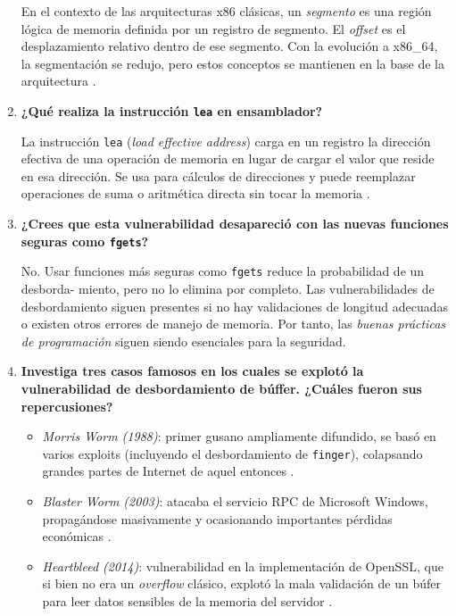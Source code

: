 \begin{enumerate}
    En el contexto de las arquitecturas x86 clásicas, un \textit{segmento} es una región 
    lógica de memoria definida por un registro de segmento. El \textit{offset} es el 
    desplazamiento relativo dentro de ese segmento. Con la evolución a x86\_64, la segmentación 
    se redujo, pero estos conceptos se mantienen en la base de la arquitectura \citep{erickson2008}.

    \item \textbf{¿Qué realiza la instrucción \texttt{lea} en ensamblador?}

    La instrucción \texttt{lea} (\textit{load effective address}) carga en un registro la
    dirección efectiva de una operación de memoria en lugar de cargar el valor que reside en 
    esa dirección. Se usa para cálculos de direcciones y puede reemplazar operaciones de suma 
    o aritmética directa sin tocar la memoria \citep{erickson2008, howard2003}.

    \item \textbf{¿Crees que esta vulnerabilidad desapareció con las nuevas funciones seguras como \texttt{fgets}?}

    No. Usar funciones más seguras como \texttt{fgets} reduce la probabilidad de un desborda-
    miento, pero no lo elimina por completo. Las vulnerabilidades de desbordamiento siguen 
    presentes si no hay validaciones de longitud adecuadas o existen otros errores de manejo 
    de memoria. Por tanto, las \textit{buenas prácticas de programación} siguen siendo 
    esenciales para la seguridad.

    \item \textbf{Investiga tres casos famosos en los cuales se explotó la vulnerabilidad de desbordamiento de búffer. ¿Cuáles fueron sus repercusiones?}

    \begin{itemize}
        \item \textit{Morris Worm (1988)}: primer gusano ampliamente difundido, se basó en
              varios exploits (incluyendo el desbordamiento de \texttt{finger}), colapsando
              grandes partes de Internet de aquel entonces \citep{gallagher2014}.
        \item \textit{Blaster Worm (2003)}: atacaba el servicio RPC de Microsoft Windows,
              propagándose masivamente y ocasionando importantes pérdidas económicas \citep{cert2003}.
        \item \textit{Heartbleed (2014)}: vulnerabilidad en la implementación de OpenSSL,
              que si bien no era un \textit{overflow} clásico, explotó la mala validación de
              un búfer para leer datos sensibles de la memoria del servidor \citep{morrisworm2018}.
    \end{itemize}


\end{enumerate}
